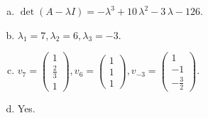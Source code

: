\begin{questions}
\begin{solution}
\begin{enumerate}[(a)]
\item $\det(A-\lambda I)=-{\lambda}^{3} + 10 \, {\lambda}^{2} - 3 \, {\lambda} - 126$.
\item ${\lambda}_1=7, {\lambda}_2=6, {\lambda}_3=-3$.
\item $v_{7}=\left(\begin{array}{r}
1 \\
\frac{2}{3} \\
1
\end{array}\right), v_{6}=\left(\begin{array}{r}
1 \\
1 \\
1
\end{array}\right), v_{-3}=\left(\begin{array}{r}
1 \\
-1 \\
-\frac{3}{2}
\end{array}\right)$.
\item Yes.
\end{enumerate}
\end{solution}

\end{questions}

\newpage


\begin{center}
\end{center}


